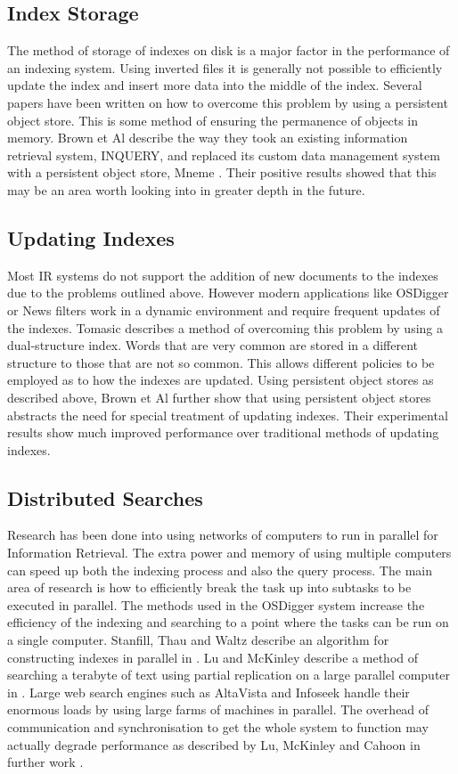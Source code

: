 \subsection{Index Storage}
The method of storage of indexes on disk is a major factor in the performance of an indexing system.  Using inverted files it is generally not possible to efficiently update the index and insert more data into the middle of the index.  Several papers have been written on how to overcome this problem by using a persistent object store.  This is some method of ensuring the permanence of objects in memory.  Brown et Al \cite{ncstrl.umassa_cs//UM-CS-1993-067} describe the way they took an existing information retrieval system, INQUERY, and replaced its custom data management system with a persistent object store, Mneme \cite{Moss:1990:DMP}.  Their positive results showed that this may be an area worth looking into in greater depth in the future.

\subsection{Updating Indexes}
Most IR systems do not support the addition of new documents to the indexes due to the problems outlined above.  However modern applications like OSDigger or News filters work in a dynamic environment and require frequent updates of the indexes.  Tomasic \cite{Tomasic:1994:IUI} describes a method of overcoming this problem by using a dual-structure index.  Words that are very common are stored in a different structure to those that are not so common.  This allows different policies to be employed as to how the indexes are updated.  Using persistent object stores as described above, Brown et Al \cite{vldb:BCC94} further show that using persistent object stores abstracts the need for special treatment of updating indexes.  Their experimental results show much improved performance over traditional methods of updating indexes.

\subsection{Distributed Searches}
Research has been done into using networks of computers to run in parallel for Information Retrieval.  The extra power and memory of using multiple computers can speed up both the indexing process and also the query process.  The main area of research is how to efficiently break the task up into subtasks to be executed in parallel.  The methods used in the OSDigger system increase the efficiency of the indexing and searching to a point where the tasks can be run on a single computer.  Stanfill, Thau and Waltz describe an algorithm for constructing indexes in parallel in \cite{Stanfill89}.  Lu and McKinley describe a method of searching a terabyte of text using partial replication on a large parallel computer in \cite{luMcK:Search_tera_repli}.  Large web search engines such as AltaVista and Infoseek handle their enormous loads by using large farms of machines in parallel.  The overhead of communication and synchronisation to get the whole system to function may actually degrade performance as described by Lu, McKinley and Cahoon in further work \cite{zhihong98:_hardw_softw_balan_act_infor}.



